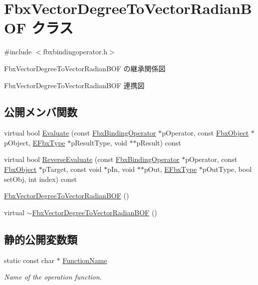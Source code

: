 \hypertarget{class_fbx_vector_degree_to_vector_radian_b_o_f}{}\section{Fbx\+Vector\+Degree\+To\+Vector\+Radian\+B\+OF クラス}
\label{class_fbx_vector_degree_to_vector_radian_b_o_f}


{\ttfamily \#include $<$fbxbindingoperator.\+h$>$}



Fbx\+Vector\+Degree\+To\+Vector\+Radian\+B\+OF の継承関係図


Fbx\+Vector\+Degree\+To\+Vector\+Radian\+B\+OF 連携図
\subsection*{公開メンバ関数}
\begin{DoxyCompactItemize}
\item 
virtual bool \hyperlink{class_fbx_vector_degree_to_vector_radian_b_o_f_a5141b54262a6aad0c2e51ec67367a578}{Evaluate} (const \hyperlink{class_fbx_binding_operator}{Fbx\+Binding\+Operator} $\ast$p\+Operator, const \hyperlink{class_fbx_object}{Fbx\+Object} $\ast$p\+Object, \hyperlink{fbxpropertytypes_8h_a73913a5ddfb20e57c6f25e9e6784bd92}{E\+Fbx\+Type} $\ast$p\+Result\+Type, void $\ast$$\ast$p\+Result) const
\item 
virtual bool \hyperlink{class_fbx_vector_degree_to_vector_radian_b_o_f_a09862a90a073963e88f63afdc60c67c8}{Reverse\+Evaluate} (const \hyperlink{class_fbx_binding_operator}{Fbx\+Binding\+Operator} $\ast$p\+Operator, const \hyperlink{class_fbx_object}{Fbx\+Object} $\ast$p\+Target, const void $\ast$p\+In, void $\ast$$\ast$p\+Out, \hyperlink{fbxpropertytypes_8h_a73913a5ddfb20e57c6f25e9e6784bd92}{E\+Fbx\+Type} $\ast$p\+Out\+Type, bool set\+Obj, int index) const
\item 
\hyperlink{class_fbx_vector_degree_to_vector_radian_b_o_f_a912062f52f69aa6a232ffc9579e49088}{Fbx\+Vector\+Degree\+To\+Vector\+Radian\+B\+OF} ()
\item 
virtual \hyperlink{class_fbx_vector_degree_to_vector_radian_b_o_f_aa10f7c14be5f0685162273cd6d7ad273}{$\sim$\+Fbx\+Vector\+Degree\+To\+Vector\+Radian\+B\+OF} ()
\end{DoxyCompactItemize}
\subsection*{静的公開変数類}
\begin{DoxyCompactItemize}
\item 
static const char $\ast$ \hyperlink{class_fbx_vector_degree_to_vector_radian_b_o_f_a69dbcc81c0c6b15cd9906886b3266481}{Function\+Name}
\begin{DoxyCompactList}\small\item\em Name of the operation function. \end{DoxyCompactList}\end{DoxyCompactItemize}


